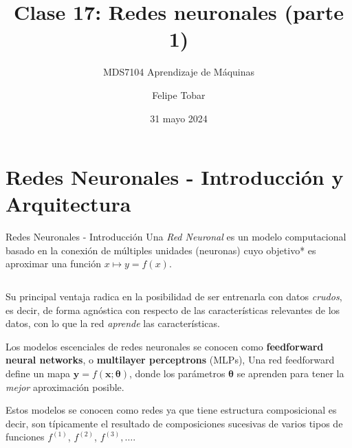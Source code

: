 \documentclass[handout, 9pt]{beamer}
\title{Clase 17: Redes neuronales (parte 1)}
\subtitle{MDS7104 Aprendizaje de Máquinas}
\date{31 mayo 2024}
\author{Felipe Tobar}
\institute{Iniciativa de Datos e Inteligencia Artificial\\Universidad de Chile}
\begin{document}
\begin{frame}
  \titlepage
\end{frame}

\section{Redes Neuronales - Introducción y Arquitectura}
\begin{frame}{Redes Neuronales - Introducción}
Una \textit{Red Neuronal} es un modelo computacional basado en la conexión de múltiples unidades (neuronas) cuyo objetivo* es aproximar una función $x\mapsto y=f(x)$.
\pause

\begin{columns}

  \begin{column}{0.5\textwidth}

  Su principal ventaja radica en la posibilidad de ser entrenarla con datos \emph{crudos}, es decir, de forma agnóstica con respecto de las características relevantes de los datos, con lo que la red \emph{aprende} las características. \pause

  \vspace{0.1cm}
  Los modelos escenciales de redes neuronales se conocen como \textbf{feedforward neural networks}, o \textbf{multilayer perceptrons} (MLPs), Una red feedforward define un mapa $\bm{y}=f(\bm{x}; \bm{\theta})$, donde los parámetros $\bm{\theta}$ se aprenden para tener la \emph{mejor} aproximación posible. \pause

  \vspace{0.1cm}

  Estos modelos se conocen como redes ya que tiene estructura composicional es decir, son típicamente el resultado de composiciones sucesivas de varios tipos de funciones $f^{(1)}$, $f^{(2)}$, $f^{(3)}, \dots$. \pause


\end{column}
\end{columns}
\end{frame}
\end{document}

